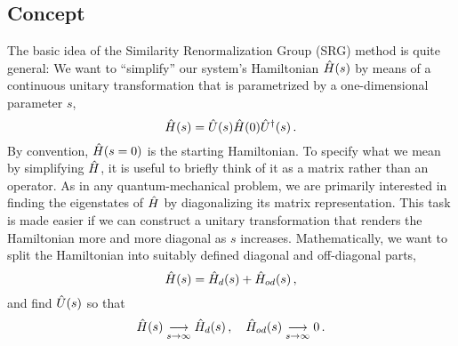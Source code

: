 {\subsection{Concept}
The basic idea of the Similarity Renormalization Group (SRG) method is 
quite general: We want to ``simplify'' our system's Hamiltonian
$\hat{H}(s)$ by means of a continuous unitary transformation that is parametrized
by a one-dimensional parameter $s$,
\begin{equation}\label{eq:cut}
  \HO(s)=\UO(s)\HO(0)\UUO(s)\,.
\end{equation}
By convention, $\hat{H}(s=0)$ is the starting Hamiltonian. To specify what we mean by 
simplifying $\hat{H}$, it is useful to briefly think of it as a matrix rather than an 
operator. As in any quantum-mechanical problem, we are primarily interested in 
finding the eigenstates of $\hat{H}$ by diagonalizing its matrix representation. This task 
is made easier if we can construct a unitary transformation that renders the Hamiltonian 
more and more diagonal as $s$ increases. Mathematically, we want to split the Hamiltonian 
into suitably defined diagonal and off-diagonal parts,
\begin{equation}
  \hat{H}(s) = \hat{H}_d(s) + \hat{H}_{od}(s)\,,
\end{equation}
and find $\hat{U}(s)$ so that
\begin{equation}\label{eq:trafo_goal}
  \HO(s)\underset{s\to\infty}{\longrightarrow}\HO_d(s)\,,\quad \HO_{od}(s)\underset{s\to\infty}{\longrightarrow} 0\,.
\end{equation}

}
